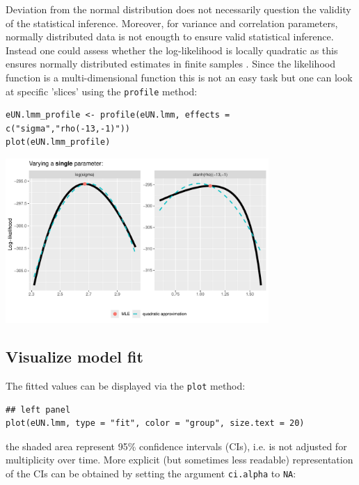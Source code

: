 \documentclass[12pt]{article}
\newcommand\Warning[1][3ex]{%
\renewcommand\stacktype{L}%
\scaleto{\stackon[1.3pt]{\color{red}$\triangle$}{\tiny\bfseries !}}{#1}%
\xspace
}
\begin{document}
\Warning Deviation from the normal distribution does not necessarily
question the validity of the statistical inference. Moreover, for
variance and correlation parameters, normally distributed data is not
enougth to ensure valid statistical inference. Instead one could
assess whether the log-likelihood is locally quadratic as this ensures
normally distributed estimates in finite samples
\citep{geyer2013asymptotics}. Since the likelihood function is a
multi-dimensional function this is not an easy task but one can look
at specific 'slices' using the \texttt{profile} method:

\lstset{language=r,label= ,caption= ,captionpos=b,numbers=none}
\begin{lstlisting}
eUN.lmm_profile <- profile(eUN.lmm, effects = c("sigma","rho(-13,-1)"))
plot(eUN.lmm_profile)
\end{lstlisting}


\begin{center}
\includegraphics[width=0.75\textwidth]{./figures/diag-profileUN.pdf}
\end{center}

\clearpage

\subsection{Visualize model fit}
\label{sec:orgb5816c5}

The fitted values can be displayed via the \texttt{plot} method:
\lstset{language=r,label= ,caption= ,captionpos=b,numbers=none}
\begin{lstlisting}
## left panel
plot(eUN.lmm, type = "fit", color = "group", size.text = 20)
\end{lstlisting}

\Warning the shaded area represent 95\% confidence intervals (CIs),
  i.e. is not adjusted for multiplicity over time. More explicit (but
  sometimes less readable) representation of the CIs can be obtained
  by setting the argument \texttt{ci.alpha} to \texttt{NA}:
\end{document}
